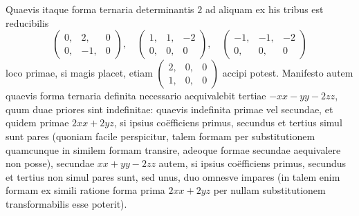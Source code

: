 Quaevis itaque forma ternaria determinantis \(2\) ad aliquam ex his tribus est reducibilis
\[
\left(\begin{smallmatrix}0,&2,&0\\0,&-1,&0\end{smallmatrix}\right),\quad
\left(\begin{smallmatrix}1,&1,&-2\\0,&0,&0\end{smallmatrix}\right),\quad
\left(\begin{smallmatrix}-1,&-1,&-2\\0,&0,&0\end{smallmatrix}\right)
\]
loco primae, si magis placet, etiam \(\left(\begin{smallmatrix}2,&0,&0\\1,&0,&0\end{smallmatrix}\right)\) accipi potest. Manifesto autem quaevis forma ternaria definita necessario aequivalebit tertiae \(-xx-yy-2zz\), quum duae priores sint indefinitae: quaevis indefinita primae vel secundae, et quidem primae \(2xx+2yz\), si ipsius co\"efficiens primus, secundus et tertius simul sunt pares (quoniam facile perspicitur, talem formam per substitutionem quamcunque in similem formam transire, adeoque formae secundae aequivalere non posse), secundae \(xx+yy-2zz\) autem, si ipsius co\"efficiens primus, secundus et tertius non simul pares sunt, sed unus, duo omnesve impares (in talem enim formam ex simili ratione forma prima \(2xx+2yz\) per nullam substitutionem transformabilis esse poterit).
